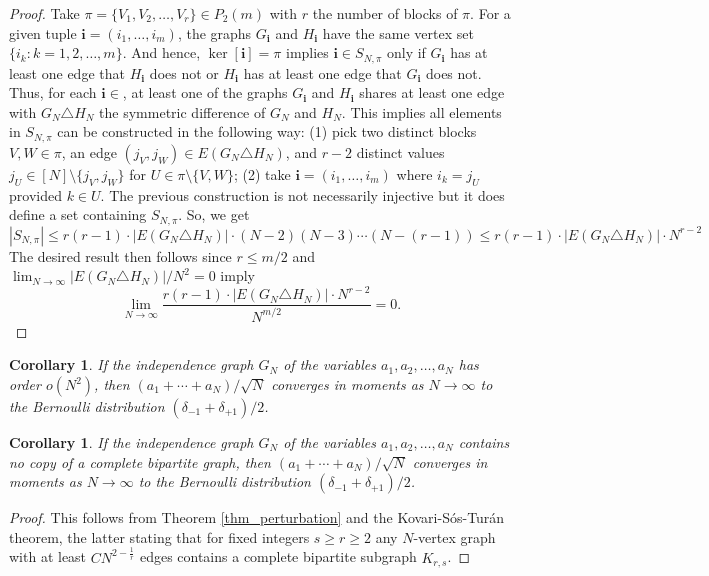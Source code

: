 \documentclass[a4paper,12pt]{extarticle}
\newtheorem{cor}[thm]{Corollary}
\theoremstyle{definition}
\theoremstyle{remark}
\newcommand{\abs}[1]{\left\vert {#1} \right\vert}
\begin{document}
\begin{proof}
	
	Take $\pi = \{ V_1, V_2, \ldots, V_r\} \in P_2(m)$ with $r$ the number of blocks of $\pi$. 
	For a given tuple $\bm{i} = (i_1,\ldots,i_m)$, the graphs $G_{\bm{i}}$ and $H_{\bm{i}}$ have the same vertex set $\{i_k : k =1,2,\ldots,m\}$. 
	And hence,  $\ker[\bm{i}] = \pi$ implies $\bm{i} \in S_{N,\pi}$ only if $G_{\bm{i}}$ has at least one edge that $H_{\bm{i}}$ does not or $H_{\bm{i}}$ has at least one edge that $G_{\bm{i}}$ does not. %
	Thus, for each $\bm{i} \in $, at least one of the graphs $G_{\bm{i}}$ and $H_{\bm{i}}$ shares at least one edge with $G_N \triangle H_N$ the symmetric difference of $G_N$ and $H_N$. 
	This implies all elements in ${S}_{N,\pi}$ can be constructed in the following way: (1) pick two distinct blocks $V,W \in \pi$, an edge $(j_V,j_W) \in E(G_N \triangle H_N)$, and $r-2$ distinct values $j_U\in [N] \setminus \{ j_V, j_W\}$ for $U \in \pi \setminus \{V,W\}$; (2) take $\bm{i} = (i_1,\ldots,i_m)$ where $i_k = j_U$ provided $k \in U$. 
	The previous construction is not necessarily injective but it does define a set containing ${S}_{N,\pi}$.  
	So, we get  
	\[
	\abs{ S_{N,\pi} }
	\leq 
	r (r-1) \cdot \abs{ E(G_N \triangle H_N) } \cdot  (N-2) (N-3) \cdots (N-(r-1))
	\leq 
	r (r-1) \cdot \abs{ E(G_N \triangle H_N) } \cdot  N^{r-2}
	\]
	The desired result then follows since  $r \leq m/2$ and $\lim_{N \to \infty}\abs{ E(G_N \triangle H_N) }/N^2 = 0$ imply 
	\[ 
	\lim_{N \to \infty}  \frac{ r (r-1) \cdot \abs{ E(G_N \triangle H_N) } \cdot  N^{r-2} }{N^{m/2}}  = 0 . 
	\]
\end{proof}

\begin{cor}
	If the independence graph $G_N$ of the variables $a_1,a_2,\ldots,a_N$ has order $o(N^2)$, then  $(a_1 + \cdots + a_N)/\sqrt{N}$ converges in moments as $N \to \infty$ to the Bernoulli distribution $(\delta_{-1} + \delta_{+1})/2$. 
\end{cor}



\begin{cor}
	If the independence graph $G_N$ of the variables $a_1,a_2,\ldots,a_N$ contains no copy of a complete bipartite graph, then $(a_1 + \cdots + a_N)/\sqrt{N}$ converges in moments as $N \to \infty$ to the Bernoulli distribution $(\delta_{-1} + \delta_{+1})/2$. 
\end{cor}
\begin{proof}
	This follows from Theorem \ref{thm_perturbation} and the Kovari-Sós-Turán theorem, the latter stating that for fixed integers $s \geq r \geq 2$ any $N$-vertex graph with at least $CN^{2-\frac{1}{r}}$ edges contains a complete bipartite subgraph $K_{r,s}$.  %
\end{proof}
\end{document}
